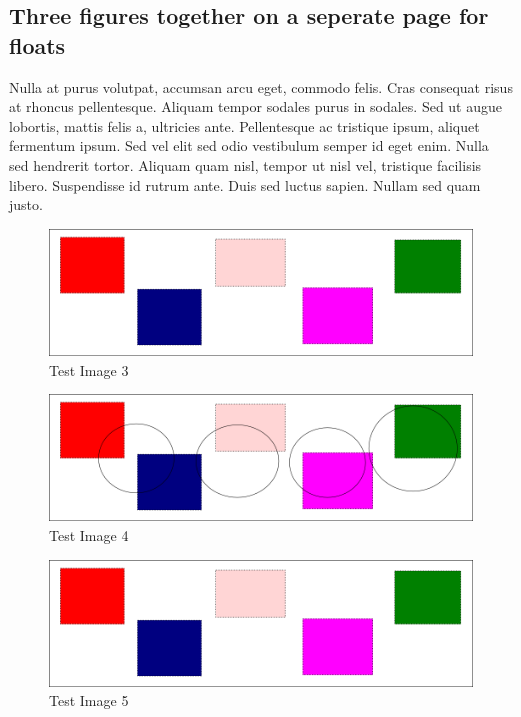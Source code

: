 \subsection{Three figures together on a seperate page for floats}
Nulla at purus volutpat, accumsan arcu eget, commodo felis. Cras consequat
risus at rhoncus pellentesque. Aliquam tempor sodales purus in sodales. Sed ut
augue lobortis, mattis felis a, ultricies ante. Pellentesque ac tristique
ipsum, aliquet fermentum ipsum. Sed vel elit sed odio vestibulum semper id eget
enim. Nulla sed hendrerit tortor. Aliquam quam nisl, tempor ut nisl vel,
tristique facilisis libero. Suspendisse id rutrum ante. Duis sed luctus sapien.
Nullam sed quam justo.

\begin{figure}[p]
    \centering
    \includegraphics[width=\textwidth]{figures/test_image}
    \caption{Test Image 3}
    \label{fig:test_image3}
\end{figure}

\begin{figure}[p]
    \centering
    \includegraphics[width=\textwidth]{figures/test_image2}
    \caption{Test Image 4}
    \label{fig:test_image4}
\end{figure}

\begin{figure}[p]
    \centering
    \includegraphics[width=\textwidth]{figures/test_image}
    \caption{Test Image 5}
    \label{fig:test_image5}
\end{figure}

